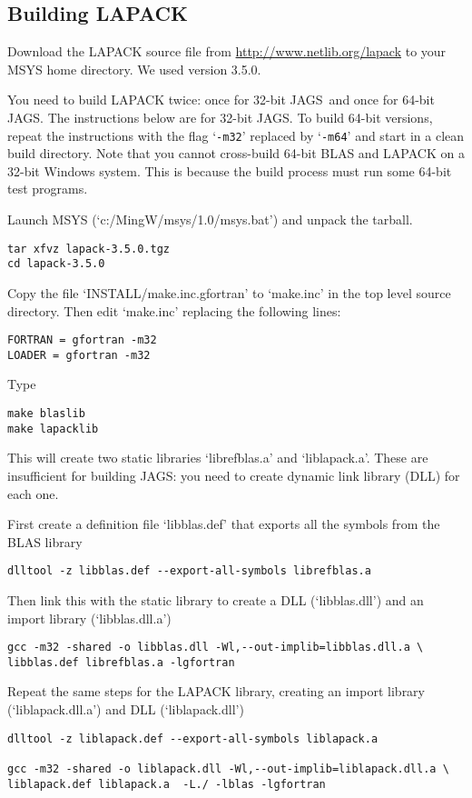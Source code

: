 \documentclass[11pt, a4paper, titlepage]{article}
\newcommand{\JAGS}{\textsf{JAGS}}
\newcommand{\samp}[1]{{`\bgroup\normalfont\texttt{#1}'\egroup}}
\newcommand{\file}[1]{{`\normalfont\textsf{#1}'}}
\let\option=\samp
\begin{document}
\subsection{Building LAPACK}

Download the LAPACK source file from
\url{http://www.netlib.org/lapack} to your MSYS home directory. We
used version 3.5.0.

You need to build LAPACK twice: once for 32-bit \JAGS\ and once for
64-bit \JAGS. The instructions below are for 32-bit \JAGS. To build
64-bit versions, repeat the instructions with the flag \option{-m32}
replaced by \option{-m64} and start in a clean build directory.  Note
that you cannot cross-build 64-bit BLAS and LAPACK on a 32-bit Windows
system. This is because the build process must run some 64-bit test
programs.

Launch MSYS (\file{c:/MingW/msys/1.0/msys.bat}) and unpack the tarball.
\begin{verbatim}
tar xfvz lapack-3.5.0.tgz
cd lapack-3.5.0
\end{verbatim}
Copy the file \file{INSTALL/make.inc.gfortran} to \file{make.inc} in
the top level source directory.  Then edit \file{make.inc} replacing
the following lines:
\begin{verbatim}
FORTRAN = gfortran -m32
LOADER = gfortran -m32
\end{verbatim}
Type
\begin{verbatim}
make blaslib
make lapacklib 
\end{verbatim}
This will create two static libraries \file{librefblas.a} and
\file{liblapack.a}. These are insufficient for building \JAGS: you
need to create dynamic link library (DLL) for each one.

First create a definition file \file{libblas.def} that exports all the
symbols from the BLAS library
\begin{verbatim}
dlltool -z libblas.def --export-all-symbols librefblas.a
\end{verbatim}
Then link this with the static library to create a DLL
(\file{libblas.dll}) and an import library (\file{libblas.dll.a})
\begin{verbatim}
gcc -m32 -shared -o libblas.dll -Wl,--out-implib=libblas.dll.a \
libblas.def librefblas.a -lgfortran 
\end{verbatim}
 
Repeat the same steps for the LAPACK library, creating an import library
(\file{liblapack.dll.a}) and DLL (\file{liblapack.dll})
\begin{verbatim}
dlltool -z liblapack.def --export-all-symbols liblapack.a

gcc -m32 -shared -o liblapack.dll -Wl,--out-implib=liblapack.dll.a \
liblapack.def liblapack.a  -L./ -lblas -lgfortran 
\end{verbatim}
\end{document}
